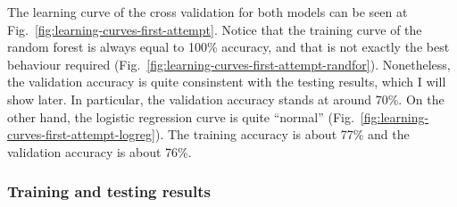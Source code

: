 \documentclass[12pt, conference]{IEEEtran}
\begin{document}
The learning curve of the cross validation for both models can be seen at Fig.~\ref{fig:learning-curves-first-attempt}. Notice that the training curve of the random forest is always equal to 100\% accuracy, and that is not exactly the best behaviour required (Fig.~\ref{fig:learning-curves-first-attempt-randfor}). Nonetheless, the validation accuracy is quite consinstent with the testing results, which I will show later. In particular, the validation accuracy stands at around 70\%. On the other hand, the logistic regression curve is quite ``normal'' (Fig.~\ref{fig:learning-curves-first-attempt-logreg}). The training accuracy is about 77\% and the validation accuracy is about 76\%.

\subsubsection{Training and testing results}



\end{document}
